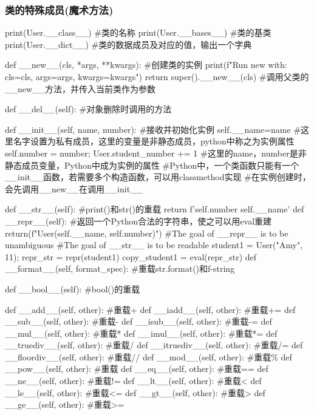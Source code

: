     \subsubsection{类的特殊成员(魔术方法)}
      \begin{codeblock}[language=python, caption={Special members for class}]
        print(User.__class__) #类的名称
        print(User.__bases__) #类的基类
        print(User.__dict__) #类的数据成员及对应的值，输出一个字典

        def __new__(cls, *args, **kwargs): #创建类的实例
            print(f"Run new with: cls={cls}, args={args}, kwargs={kwargs}")
            return super().__new__(cls) #调用父类的\_\_new\_\_方法，并传入当前类作为参数

        def __del__(self): #对象删除时调用的方法

        def __init__(self, name, number): #接收并初始化实例
            self.__name=name #这里名字设置为私有成员，这里的变量是非静态成员，python中称之为实例属性
            self.number = number; 
            User.student_number += 1
            #这里的name，number是非静态成员变量，Python中成为实例的属性
            #Python中，一个类函数只能有一个\_\_init\_\_函数，若需要多个构造函数，可以用classmethod实现
        #在实例创建时，会先调用\_\_new\_\_在调用\_\_init\_\_

        def __str__(self): #print()和str()的重载
            return f'{self.number} {self.__name}'
        def __repr__(self): #返回一个Python合法的字符串，使之可以用eval重建
            return(f"User({self.__name}, {self.number})")
            #The goal of \_\_repr\_\_ is to be unambiguous
            #The goal of \_\_str\_\_ is to be readable
        student1 = User("Amy", 11); repr_str = repr(student1)
        copy_student1 = eval(repr_str)
        def __format__(self, format_spec): #重载str.format()和f-string

        def __bool__(self): #bool()的重载

        def __add__(self, other): #重载+
        def __iadd__(self, other): #重载+=
        def __sub__(self, other): #重载-
        def __isub__(self, other): #重载-=
        def __mul__(self, other): #重载*
        def __imul__(self, other): #重载*=
        def __truediv__(self, other): #重载/
        def __itruediv__(self, other): #重载/=
        def __floordiv__(self, other): #重载//
        def __mod__(self, other): #重载\%
        def __pow__(self, other): #重载\*\*
        def __eq__(self, other): #重载==
        def __ne__(self, other): #重载!=
        def __lt__(self, other): #重载<
        def __le__(self, other): #重载<=
        def __gt__(self, other): #重载>
        def __ge__(self, other): #重载>=


\end{codeblock}
